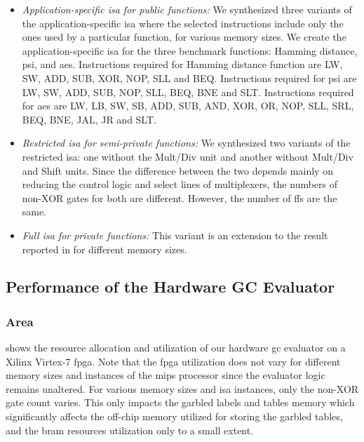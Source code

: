 \begin{itemize}
	\item \emph{Application-specific \acrshort{isa} for public functions:} We synthesized three variants of the application-specific \acrshort{isa} where the selected instructions include only the ones used by a particular function, for various memory sizes.
	We create the application-specific \acrshort{isa} for the three benchmark functions: Hamming distance, \acrshort{psi}, and \acrshort{aes}.
	Instructions required for Hamming distance function are LW, SW, ADD, SUB, XOR, NOP, SLL and BEQ.
	Instructions required for \acrshort{psi} are LW, SW, ADD, SUB, NOP, SLL, BEQ, BNE and SLT.
 	Instructions required for \acrshort{aes} are LW, LB, SW, SB, ADD, SUB, AND, XOR, OR, NOP, SLL, SRL, BEQ, BNE, JAL, JR and SLT.

	\item \emph{Restricted \acrshort{isa} for semi-private functions:} We synthesized two variants of the restricted \acrshort{isa}: one without the Mult/Div unit and another without Mult/Div and Shift units.
	Since the difference between the two depends mainly on reducing the control logic and select lines of multiplexers, the numbers of non-XOR gates for both are different.
	However, the number of \acrshort{ff}s are the same.

	\item \emph{Full \acrshort{isa} for private
	functions:} This variant is an extension to the result reported in  for different memory sizes.
\end{itemize}

\subsection{Performance of the Hardware GC Evaluator} \label{ssect:eval-mips-sfe-performance}
\subsubsection{Area}
 shows the resource allocation and utilization of our hardware \acrshort{gc} evaluator on a Xilinx Virtex-7 \acrshort{fpga}.
Note that the \acrshort{fpga} utilization does not vary for different memory sizes and instances of the \gls{mips} processor since the evaluator logic remains unaltered.
For various memory sizes and \acrshort{isa} instances, only the non-XOR gate count varies.
This only impacts the garbled labels and tables memory which significantly affects the off-chip memory utilized for storing the garbled tables, and the \acrfull{bram} resources utilization only to a small extent.

